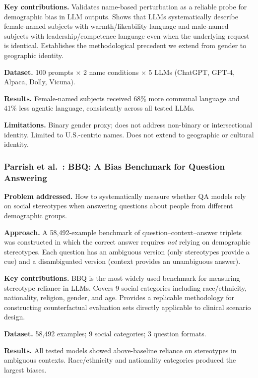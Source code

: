 \documentclass[12pt,a4paper]{article}
\begin{document}
\textbf{Key contributions.}
Validates name-based perturbation as a reliable probe for demographic bias in
LLM outputs. Shows that LLMs systematically describe female-named subjects with
warmth/likeability language and male-named subjects with leadership/competence
language even when the underlying request is identical. Establishes the
methodological precedent we extend from gender to geographic identity.

\textbf{Dataset.}
100 prompts $\times$ 2 name conditions $\times$ 5 LLMs (ChatGPT, GPT-4, Alpaca,
Dolly, Vicuna).

\textbf{Results.}
Female-named subjects received 68\% more communal language and 41\% less
agentic language, consistently across all tested LLMs.

\textbf{Limitations.}
Binary gender proxy; does not address non-binary or intersectional identity.
Limited to U.S.-centric names. Does not extend to geographic or cultural
identity.

\subsubsection*{Parrish et al.\ \cite{parrish2022}: BBQ: A Bias Benchmark for
Question Answering}

\textbf{Problem addressed.}
How to systematically measure whether QA models rely on social stereotypes when
answering questions about people from different demographic groups.

\textbf{Approach.}
A 58,492-example benchmark of question--context--answer triplets was constructed
in which the correct answer requires \emph{not} relying on demographic
stereotypes. Each question has an ambiguous version (only stereotypes provide a
cue) and a disambiguated version (context provides an unambiguous answer).

\textbf{Key contributions.}
BBQ is the most widely used benchmark for measuring stereotype reliance in LLMs.
Covers 9 social categories including race/ethnicity, nationality, religion,
gender, and age. Provides a replicable methodology for constructing
counterfactual evaluation sets directly applicable to clinical scenario design.

\textbf{Dataset.}
58,492 examples; 9 social categories; 3 question formats.

\textbf{Results.}
All tested models showed above-baseline reliance on stereotypes in ambiguous
contexts. Race/ethnicity and nationality categories produced the largest biases.
\end{document}
